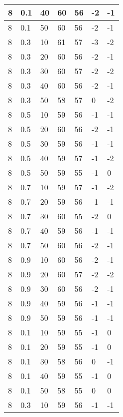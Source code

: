 \begin{longtable}{|l|l|l|l|l|l|l|}
		8     & 0.1 & 40   & 60 & 56 & -2  & -1  \\ \hline
		8     & 0.1 & 50   & 60 & 56 & -2  & -1  \\ \hline
		8     & 0.3 & 10   & 61 & 57 & -3  & -2  \\ \hline
		8     & 0.3 & 20   & 60 & 56 & -2  & -1  \\ \hline
		8     & 0.3 & 30   & 60 & 57 & -2  & -2  \\ \hline
		8     & 0.3 & 40   & 60 & 56 & -2  & -1  \\ \hline
		8     & 0.3 & 50   & 58 & 57 & 0   & -2  \\ \hline
		8     & 0.5 & 10   & 59 & 56 & -1  & -1  \\ \hline
		8     & 0.5 & 20   & 60 & 56 & -2  & -1  \\ \hline
		8     & 0.5 & 30   & 59 & 56 & -1  & -1  \\ \hline
		8     & 0.5 & 40   & 59 & 57 & -1  & -2  \\ \hline
		8     & 0.5 & 50   & 59 & 55 & -1  & 0   \\ \hline
		8     & 0.7 & 10   & 59 & 57 & -1  & -2  \\ \hline
		8     & 0.7 & 20   & 59 & 56 & -1  & -1  \\ \hline
		8     & 0.7 & 30   & 60 & 55 & -2  & 0   \\ \hline
		8     & 0.7 & 40   & 59 & 56 & -1  & -1  \\ \hline
		8     & 0.7 & 50   & 60 & 56 & -2  & -1  \\ \hline
		8     & 0.9 & 10   & 60 & 56 & -2  & -1  \\ \hline
		8     & 0.9 & 20   & 60 & 57 & -2  & -2  \\ \hline
		8     & 0.9 & 30   & 60 & 56 & -2  & -1  \\ \hline
		8     & 0.9 & 40   & 59 & 56 & -1  & -1  \\ \hline
		8     & 0.9 & 50   & 59 & 56 & -1  & -1  \\ \hline
		8     & 0.1 & 10   & 59 & 55 & -1  & 0   \\ \hline
		8     & 0.1 & 20   & 59 & 55 & -1  & 0   \\ \hline
		8     & 0.1 & 30   & 58 & 56 & 0   & -1  \\ \hline
		8     & 0.1 & 40   & 59 & 55 & -1  & 0   \\ \hline
		8     & 0.1 & 50   & 58 & 55 & 0   & 0   \\ \hline
		8     & 0.3 & 10   & 59 & 56 & -1  & -1  \\ \hline

\end{longtable}
